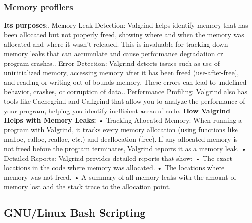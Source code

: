 \documentclass{article}
\begin{document}
\subsubsection{Memory profilers}
\textbf{Its purposes}:.	Memory Leak Detection:
Valgrind helps identify memory that has been allocated but not properly freed, showing where and when the memory was allocated and where it wasn’t released. This is invaluable for tracking down memory leaks that can accumulate and cause performance degradation or program crashes.\newline{}.	Error Detection:
Valgrind detects issues such as use of uninitialized memory, accessing memory after it has been freed (use-after-free), and reading or writing out-of-bounds memory. These errors can lead to undefined behavior, crashes, or corruption of data.\newline{}.	Performance Profiling:
Valgrind also has tools like Cachegrind and Callgrind that allow you to analyze the performance of your program, helping you identify inefficient areas of code.\newline\newline
\textbf{How Valgrind Helps with Memory Leaks:}\newline
	•	Tracking Allocated Memory:
When running a program with Valgrind, it tracks every memory allocation (using functions like malloc, calloc, realloc, etc.) and deallocation (free). If any allocated memory is not freed before the program terminates, Valgrind reports it as a memory leak.\newline\newline
	•	Detailed Reports:
Valgrind provides detailed reports that show:\newline\newline
	•	The exact locations in the code where memory was allocated.\newline\newline
	•	The locations where memory was not freed.\newline\newline
	•	A summary of all memory leaks with the amount of memory lost and the stack trace to the allocation point.

\subsection{GNU/Linux Bash Scripting}
\end{document}
